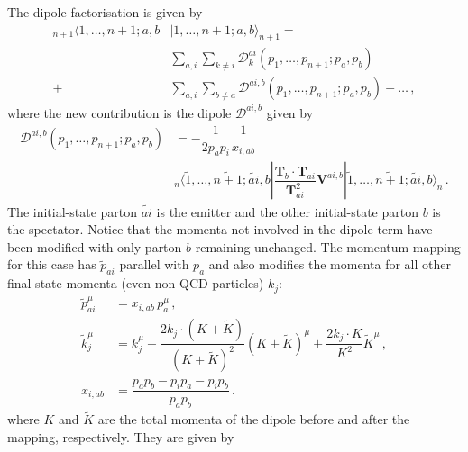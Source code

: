 \documentclass[main.tex]{subfiles}
\begin{document}
        The dipole factorisation is given by
        \begin{equation}\label{eqn:II_factorisation}
            \begin{split}
                {}_{n+1} \langle 1, \ldots, n+1; a,b &| 1, \ldots, n+1;a,b \rangle_{n+1} = \\
                &\sum_{a,i}\sum_{k \neq i} \mathcal{D}_{k}^{ai}(p_{1}, \ldots, p_{n+1};p_{a},p_{b}) \\
                + &\sum_{a,i}\sum_{b \neq a} \mathcal{D}^{ai,b}(p_{1}, \ldots, p_{n+1};p_{a},p_{b}) + \ldots \, ,
            \end{split}
        \end{equation}
        where the new contribution is the dipole $\mathcal{D}^{ai,b}$ given by
        \begin{equation}\label{eqn:D_aib}
            \begin{split}
                \mathcal{D}^{ai,b}(p_{1},\ldots,p_{n+1};p_{a},p_{b}) &= -\dfrac{1}{2p_{a}p_{i}} \dfrac{1}{x_{i,ab}} \\
                &{}_{n}\langle \tilde{1}, \ldots, \widetilde{n+1}; \widetilde{ai}, b | \dfrac{\boldsymbol{T}_{b}\cdot\boldsymbol{T}_{ai}}{\boldsymbol{T}^{2}_{ai}}\boldsymbol{V}^{ai,b} | \tilde{1}, \ldots, \widetilde{n+1}; \widetilde{ai}, b \rangle_{n} \, .
            \end{split}
        \end{equation}
        The initial-state parton $\widetilde{ai}$ is the emitter and the
        other initial-state parton $b$ is the spectator. Notice that the
        momenta not involved in the dipole term have been modified with only
        parton $b$ remaining unchanged. The momentum mapping for this case
        has $\tilde{p}_{ai}$ parallel with $p_{a}$ and also
        modifies the momenta for all other final-state momenta (even non-QCD particles) $k_{j}$:
        \begin{align}\label{eqn:II_mapping}
            \tilde{p}_{ai}^{\mu} &= x_{i,ab} \, p_{a}^{\mu} \, , \nonumber \\
            \tilde{k}_{j}^{\mu} &= k_{j}^{\mu} - \dfrac{2k_{j} \cdot (K+\widetilde{K})}{(K+\widetilde{K})^{2}}(K+\widetilde{K})^{\mu} + \dfrac{2k_{j} \cdot K}{K^{2}}\widetilde{K}^{\mu} \, , \\
            x_{i,ab} &= \dfrac{p_{a}p_{b} - p_{i}p_{a}-p_{i}p_{b}}{p_{a}p_{b}} \, . \nonumber
        \end{align}
        where $K$ and $\widetilde{K}$ are the total momenta
        of the dipole before and after the mapping, respectively. They are given by
\end{document}

